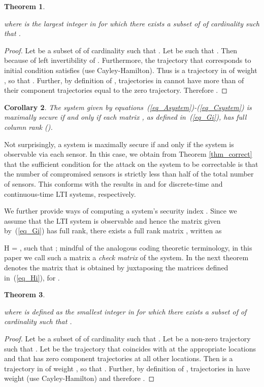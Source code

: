 \documentclass[letterpaper, 10 pt, conference]{ieeeconf}
\newcommand{\beq}{}
\newcommand{\bmat}{\left[ \begin{array}}
\newcommand{\emat}{\end{array} \right]}
\newtheorem{thm}{Theorem}[section]
\newtheorem{cor}[thm]{Corollary}
\begin{document}
\begin{thm}\label{thm_GJ}

where  is the largest integer in  for which there exists a subset  of  of cardinality  such that .
\end{thm}
\begin{proof}
		Let  be a subset of  of cardinality  such that . Let  be such that . Then   because of left invertibility of . Furthermore, the trajectory  that corresponds to initial condition  satisfies  (use Cayley-Hamilton). Thus  is a trajectory in  of weight , so that . Further, by definition of , trajectories in  cannot have more than  of their component trajectories equal to the zero trajectory. Therefore .
\end{proof}
\begin{cor} \label{cor:max_secure_G}
The system  given by equations~(\ref{eq_Asystem})-(\ref{eq_Csystem}) is maximally secure if and only if each matrix , as defined in~(\ref{eq_Gi}), has full column rank ().
\end{cor}

Not surprisingly, a system is maximally secure if and only if the system is observable via each sensor. In this case, we obtain from Theorem \ref{thm_correct} that the sufficient condition for the attack on the system to be correctable is that the number of compromised sensors is strictly less than half of the total number of sensors. This conforms with the results in \cite{fawziTD14} and \cite{ChongWakaikiHespanhaACC15} for discrete-time and continuous-time LTI systems, respectively.

We further provide ways of computing a system's security index . Since we assume that the LTI system is observable and hence the  matrix  given by~(\ref{eq_Gi}) has full rank, there exists a full rank  matrix , written as 
\beq
H = \bmat{cccc} H_1 & H_2 & \cdots & H_N \emat ,\label{eq_Hi}
\eeq
such that ; mindful of the analogous coding theoretic terminology, in this paper we call such a matrix  a {\em check matrix} of the system. In the next theorem  denotes the matrix that is obtained by juxtaposing the matrices  defined in~(\ref{eq_Hi}), for .
\begin{thm}\label{thm_HJ}

where  is defined as the smallest integer  in  for which there exists a subset  of  of cardinality  such that . 
\end{thm} 
\begin{proof}
		Let  be a subset of  of cardinality  such that . Let  be a non-zero trajectory such that . Let  be the trajectory that coincides with  at the appropriate locations and that has zero component trajectories at all other locations. Then  is a trajectory in  of weight , so that . Further, by definition of , trajectories in  have weight  (use Cayley-Hamilton) and therefore . 
\end{proof}
\end{document}
